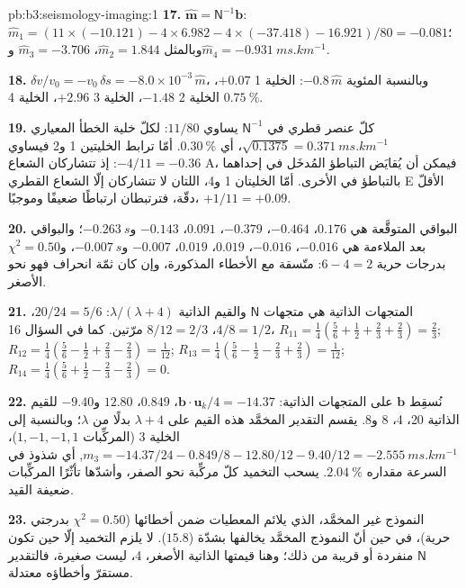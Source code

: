 \begin{solution}{pb:b3:seismology-imaging:1}
\textbf{17.} $\hat{\mathbf m} = \mathsf N^{-1}\mathbf b$:
$\hat m_1 = (11\times(-10.121) - 4\times6.982 - 4\times(-37.418) - 16.921)/80
= -0.081$؛ وبالمثل $\hat m_2 = 1.844$، $\hat m_3 = -3.706$
و$\hat m_4 = \qty{-0.931}{ms.km^{-1}}$.

 \textbf{18.} $\delta v/v_0 = -v_0\,\delta s = -8.0\times10^{-3}\,\hat m$، وبالنسبة
المئوية $-0.8\,\hat m$: الخلية 1 $+0.07$، الخلية 2 $-1.48$، الخلية 3 $+2.96$، الخلية 4
$\qty{+0.75}{\percent}$.

 \textbf{19.} كلّ عنصر قطري في $\mathsf N^{-1}$ يساوي $11/80$: لكلّ خلية
الخطأ المعياري $\sqrt{0.1375} = \qty{0.371}{ms.km^{-1}}$، أي
$\qty{0.30}{\percent}$. أمّا ترابط الخليتين 1 و2 فيساوي $-4/11 = -0.36$:
إذ تتشاركان الشعاع A، فيمكن أن يُقايَض التباطؤ المُدخَل في إحداهما بالتباطؤ في الأخرى.
أمّا الخليتان 1 و4، اللتان لا تتشاركان إلّا الشعاع القطري E الأقلّ دقّة، فترتبطان ارتباطًا ضعيفًا
وموجبًا، $+1/11 = +0.09$.

 \textbf{20.} البواقي المتوقَّعة هي $0.176$، $-0.464$، $-0.379$، $0.091$،
$-0.143$ و$\qty{-0.263}{s}$؛ والبواقي بعد الملاءمة هي $-0.016$،
$-0.016$، $0.019$، $0.019$، $-0.007$ و$\qty{-0.007}{s}$،
و$\chi^2 = 0.50$ بدرجات حرية $6 - 4 = 2$: متّسقة مع الأخطاء المذكورة،
وإن كان ثمّة انحراف فهو نحو الأصغر.

 \textbf{21.} المتجهات الذاتية هي متجهات $\mathsf N$ والقيم الذاتية
$\lambda/(\lambda + 4)$: $20/24 = 5/6$، $4/8 = 1/2$، $8/12 = 2/3$ مرّتين. كما في
السؤال 16، $R_{11} = \tfrac14(\tfrac56 + \tfrac12 + \tfrac23 + \tfrac23) =
\tfrac23$; $R_{12} = \tfrac14(\tfrac56 - \tfrac12 + \tfrac23 - \tfrac23) =
\tfrac1{12}$; $R_{13} = \tfrac14(\tfrac56 - \tfrac12 - \tfrac23 + \tfrac23) =
\tfrac1{12}$; $R_{14} = \tfrac14(\tfrac56 + \tfrac12 - \tfrac23 - \tfrac23) = 0$.

 \textbf{22.} نُسقِط $\mathbf b$ على المتجهات الذاتية: $\mathbf b\cdot\mathbf u_k/4
= -14.37$، $0.849$، $12.80$ و$-9.40$ للقيم الذاتية 20، 4، 8 و8.
يقسم التقدير المخمَّد هذه القيم على $\lambda + 4$ بدلًا من $\lambda$؛ وبالنسبة إلى
الخلية 3 (المركِّبات $1, -1, -1, 1$)،
$m_3 = -14.37/24 - 0.849/8 - 12.80/12 - 9.40/12 = \qty{-2.555}{ms.km^{-1}}$,
أي شذوذ في السرعة مقداره $\qty{+2.04}{\percent}$. يسحب التخميد كلّ مركِّبة
نحو الصفر، وأشدّها تأثّرًا المركِّبات ضعيفة القيد.

 \textbf{23.} النموذج غير المخمَّد، الذي يلائم المعطيات ضمن أخطائها
($\chi^2 = 0.50$ بدرجتي حرية)، في حين أنّ النموذج المخمَّد يخالفها
بشدّة ($15.8$). لا يلزم التخميد إلّا حين تكون $\mathsf N$ منفردة أو قريبة
من ذلك؛ وهنا قيمتها الذاتية الأصغر، 4، ليست صغيرة، فالتقدير مستقرّ
وأخطاؤه معتدلة.


\end{solution}
